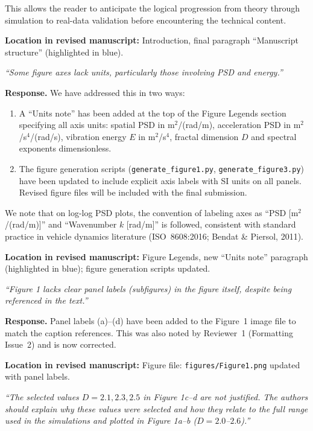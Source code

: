 \documentclass[11pt]{article}
\newcommand{\revquote}[1]{\medskip\noindent\textit{``#1''}\medskip}
\newcommand{\revloc}[1]{\noindent\textbf{Location in revised manuscript:} #1\medskip}
\begin{document}
\noindent This allows the reader to anticipate the logical progression from theory through simulation to real-data validation before encountering the technical content.

\revloc{Introduction, final paragraph ``Manuscript structure'' (highlighted in blue).}

\bigskip

\revquote{Some figure axes lack units, particularly those involving PSD and energy.}

\noindent\textbf{Response.} We have addressed this in two ways:

\begin{enumerate}[leftmargin=*]
\item A ``Units note'' has been added at the top of the Figure Legends section specifying all axis units: spatial PSD in m$^2$/(rad/m), acceleration PSD in m$^2$/s$^4$/(rad/s), vibration energy $E$ in m$^2$/s$^4$, fractal dimension $D$ and spectral exponents dimensionless.

\item The figure generation scripts (\texttt{generate\_figure1.py}, \texttt{generate\_figure3.py}) have been updated to include explicit axis labels with SI units on all panels. Revised figure files will be included with the final submission.
\end{enumerate}

\noindent We note that on log-log PSD plots, the convention of labeling axes as ``PSD [m$^2$/(rad/m)]'' and ``Wavenumber $k$ [rad/m]'' is followed, consistent with standard practice in vehicle dynamics literature (ISO~8608:2016; Bendat \& Piersol, 2011).

\revloc{Figure Legends, new ``Units note'' paragraph (highlighted in blue); figure generation scripts updated.}

\bigskip

\revquote{Figure 1 lacks clear panel labels (subfigures) in the figure itself, despite being referenced in the text.}

\noindent\textbf{Response.} Panel labels (a)--(d) have been added to the Figure~1 image file to match the caption references. This was also noted by Reviewer~1 (Formatting Issue~2) and is now corrected.

\revloc{Figure file: \texttt{figures/Figure1.png} updated with panel labels.}

\bigskip

\revquote{The selected values $D=2.1, 2.3, 2.5$ in Figure 1c--d are not justified. The authors should explain why these values were selected and how they relate to the full range used in the simulations and plotted in Figure 1a--b ($D=2.0$--$2.6$).}
\end{document}
